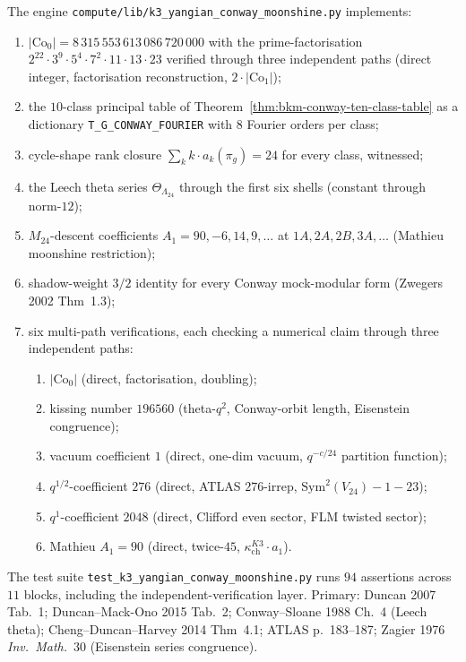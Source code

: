 \begin{remark}%
\label{rem:bkm-conway-compute}%
The engine
\texttt{compute/lib/k3\_yangian\_conway\_moonshine.py}
implements:
\begin{enumerate}[label=\textup{(\roman*)}]
\item $|\mathrm{Co}_0| = 8\,315\,553\,613\,086\,720\,000$ with the
prime-factorisation $2^{22} \cdot 3^9 \cdot 5^4 \cdot 7^2 \cdot 11
\cdot 13 \cdot 23$ verified through three independent paths (direct
integer, factorisation reconstruction, $2\cdot|\mathrm{Co}_1|$);
\item the $10$-class principal table of
Theorem~\ref{thm:bkm-conway-ten-class-table} as a dictionary
\texttt{T\_G\_CONWAY\_FOURIER} with $8$ Fourier orders per class;
\item cycle-shape rank closure $\sum_k k \cdot a_k(\pi_g) = 24$
for every class, witnessed;
\item the Leech theta series $\Theta_{\Lambda_{24}}$ through the
first six shells (constant through norm-$12$);
\item $M_{24}$-descent coefficients $A_1 = 90, -6, 14, 9, \ldots$ at
$1A, 2A, 2B, 3A, \ldots$ (Mathieu moonshine restriction);
\item shadow-weight $3/2$ identity for every Conway mock-modular form
(Zwegers 2002 Thm~1.3);
\item six multi-path verifications, each checking a numerical claim
through three independent paths:
\begin{enumerate}[label=\textup{(\alph*)}]
\item $|\mathrm{Co}_0|$ (direct, factorisation, doubling);
\item kissing number $196560$ (theta-$q^2$, Conway-orbit length,
Eisenstein congruence);
\item vacuum coefficient $1$ (direct, one-dim vacuum,
$q^{-c/24}$ partition function);
\item $q^{1/2}$-coefficient $276$ (direct, ATLAS $276$-irrep,
$\mathrm{Sym}^2(V_{24}) - 1 - 23$);
\item $q^{1}$-coefficient $2048$ (direct, Clifford even sector,
FLM twisted sector);
\item Mathieu $A_1 = 90$ (direct, twice-$45$, $\kappa_{\mathrm{ch}}^{K3}\cdot a_1$).
\end{enumerate}
\end{enumerate}
The test suite
\texttt{test\_k3\_yangian\_conway\_moonshine.py} runs $94$
assertions across $11$ blocks, including the independent-verification
layer. Primary: Duncan 2007 Tab.~1; Duncan--Mack-Ono
2015 Tab.~2; Conway--Sloane 1988 Ch.~4 (Leech theta);
Cheng--Duncan--Harvey 2014 Thm~4.1; ATLAS p.~183--187; Zagier 1976
\emph{Inv.~Math.}~30 (Eisenstein series congruence).
\end{remark}

